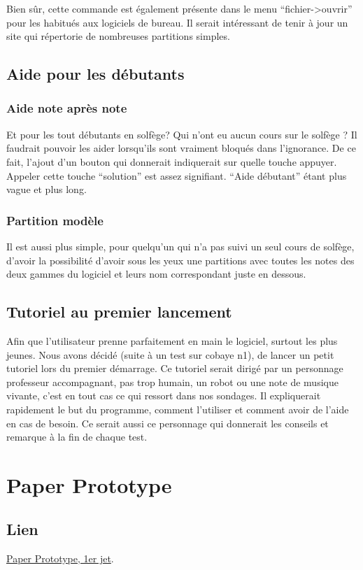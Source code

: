 \documentclass{article}
\begin{document}
 
 Bien sûr, cette commande est également présente dans le menu ``fichier->ouvrir'' pour les habitués aux logiciels de bureau.
 Il serait intéressant de tenir à jour un site qui répertorie de nombreuses partitions simples.
\subsection{Aide pour les débutants}
\subsubsection{Aide note après note}
Et pour les tout débutants en solfège? Qui n'ont eu aucun cours sur le solfège ? Il faudrait pouvoir les aider lorsqu'ils sont 
vraiment bloqués dans l'ignorance. De ce fait, l'ajout d'un bouton qui donnerait indiquerait sur quelle touche appuyer.
Appeler cette touche ``solution'' est assez signifiant. ``Aide débutant'' étant plus vague et plus long.
\subsubsection{Partition modèle}
Il est aussi plus simple, pour quelqu'un qui n'a pas suivi un seul cours de solfège, d'avoir la possibilité d'avoir sous les yeux une
partitions avec toutes les notes des deux gammes du logiciel et leurs nom correspondant juste en dessous.
\subsection{Tutoriel au premier lancement}

Afin que l'utilisateur prenne parfaitement en main le logiciel, surtout les plus jeunes. Nous avons décidé (suite à un test sur cobaye n1),
de lancer un petit tutoriel lors du premier démarrage. Ce tutoriel serait dirigé par un personnage professeur accompagnant,
pas trop humain, un robot ou une note de musique vivante, c'est en tout cas ce qui ressort dans nos sondages.
Il expliquerait rapidement le but du programme, comment l'utiliser et comment avoir de l'aide en cas de besoin.
Ce serait aussi ce personnage qui donnerait les conseils et remarque à la fin de chaque test.





\section{Paper Prototype}
\subsection{Lien}
\href{https://www.youtube.com/watch?v=gwFMDVW2Swo}{Paper Prototype, 1er jet}.
\end{document}
